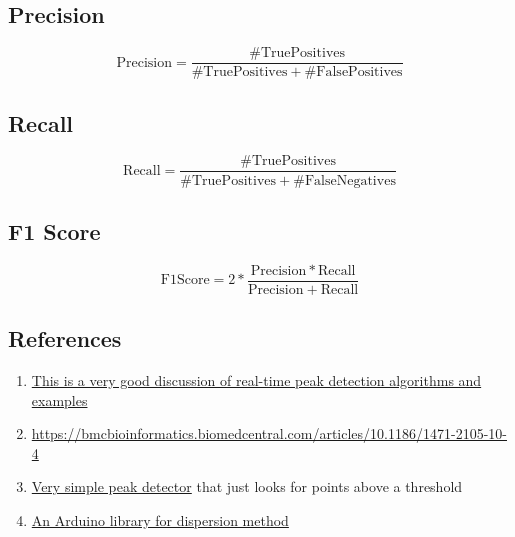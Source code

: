 \subsection{Precision}
\begin{equation}
    \mathrm{Precision} = \frac{\mathrm{\# True Positives}}{\mathrm{\# True Positives}+\mathrm{\# False Positives}}
\end{equation}

\subsection{Recall}
\begin{equation}
    \mathrm{Recall} = \frac{\mathrm{\# True Positives}}{\mathrm{\# True Positives}+\mathrm{\# False Negatives}}
\end{equation}

\subsection{F1 Score}
\begin{equation}
    \mathrm{F1 Score} = 2*\frac{\mathrm{Precision*Recall}}{\mathrm{Precision+Recall}}
\end{equation}



\subsection{References}
\begin{enumerate}
    \item \href{https://stackoverflow.com/questions/22583391/peak-signal-detection-in-realtime-timeseries-data}
                {This is a very good discussion of real-time peak detection algorithms and examples}
    \item \href{https://bmcbioinformatics.biomedcentral.com/articles/10.1186/1471-2105-10-4}
                {https://bmcbioinformatics.biomedcentral.com/articles/10.1186/1471-2105-10-4}
    \item \href{https://forum.arduino.cc/t/detection-of-a-vibration-peak/423080/9}{Very simple peak detector} that just
                looks for points above a threshold
    \item \href{https://github.com/leandcesar/PeakDetection}{An Arduino library for dispersion method}
\end{enumerate}
